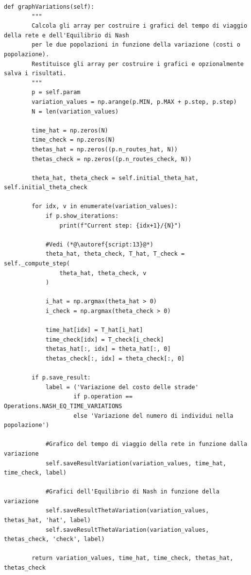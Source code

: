 \begin{lstlisting}[style=myStile, caption={Initializer::graphVariations}, label={script:6}]
    def graphVariations(self):
        """
        Calcola gli array per costruire i grafici del tempo di viaggio della rete e dell'Equilibrio di Nash
        per le due popolazioni in funzione della variazione (costi o popolazione).
        Restituisce gli array per costruire i grafici e opzionalmente salva i risultati.
        """
        p = self.param
        variation_values = np.arange(p.MIN, p.MAX + p.step, p.step)
        N = len(variation_values)

        time_hat = np.zeros(N)
        time_check = np.zeros(N)
        thetas_hat = np.zeros((p.n_routes_hat, N))
        thetas_check = np.zeros((p.n_routes_check, N))

        theta_hat, theta_check = self.initial_theta_hat, self.initial_theta_check

        for idx, v in enumerate(variation_values):
            if p.show_iterations:
                print(f"Current step: {idx+1}/{N}")

            #Vedi (*@\autoref{script:13}@*)
            theta_hat, theta_check, T_hat, T_check = self._compute_step(
                theta_hat, theta_check, v
            )

            i_hat = np.argmax(theta_hat > 0)
            i_check = np.argmax(theta_check > 0)

            time_hat[idx] = T_hat[i_hat]
            time_check[idx] = T_check[i_check]
            thetas_hat[:, idx] = theta_hat[:, 0]
            thetas_check[:, idx] = theta_check[:, 0]

        if p.save_result:
            label = ('Variazione del costo delle strade'
                    if p.operation == Operations.NASH_EQ_TIME_VARIATIONS
                    else 'Variazione del numero di individui nella popolazione')

            #Grafico del tempo di viaggio della rete in funzione dalla variazione
            self.saveResultVariation(variation_values, time_hat, time_check, label)
            
            #Grafici dell'Equilibrio di Nash in funzione della variazione
            self.saveResultThetaVariation(variation_values, thetas_hat, 'hat', label)
            self.saveResultThetaVariation(variation_values, thetas_check, 'check', label)

        return variation_values, time_hat, time_check, thetas_hat, thetas_check
\end{lstlisting}

